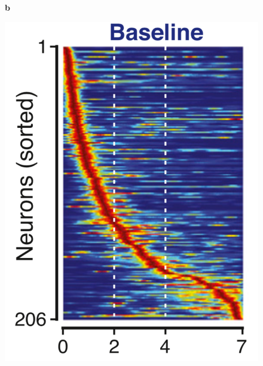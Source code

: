 \documentclass{apa}
\begin{document}
\begin{figure}
\begin{minipage}{\linewidth}
\begin{minipage}{.19\linewidth}
	\end{minipage}
	\begin{minipage}{.28\linewidth}
		\textbf{b}
		\begin{center}
				\includegraphics[width =\linewidth]{figs/RobiEtal17.png}

\end{center}
\end{minipage}
\end{minipage}
\end{figure}
\end{document}
